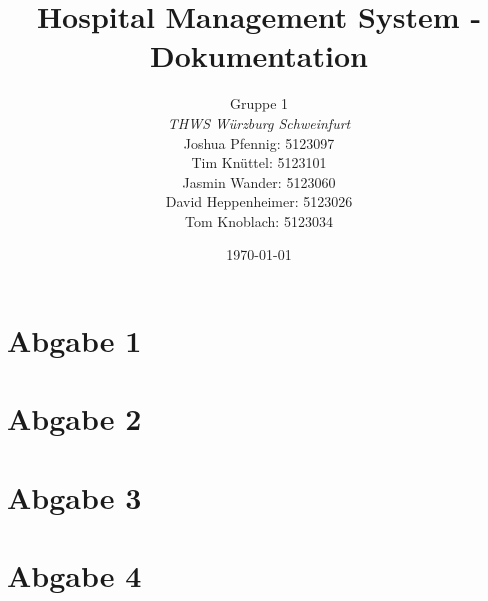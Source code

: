 \documentclass[a4paper,12pt]{report}
\title{Hospital Management System - Dokumentation }
\author{
  {\Large Gruppe 1} \\[0.5em]
  {\large \textit{THWS W\"urzburg Schweinfurt}} \\[1em]
  Joshua Pfennig: 5123097\\
  Tim Kn\"uttel: 5123101\\
  Jasmin Wander: 5123060\\
  David Heppenheimer: 5123026\\
  Tom Knoblach: 5123034
}
\date{\today}
\begin{document}
\maketitle

\clearpage
\tableofcontents
\clearpage

\chapter{Abgabe 1}









\chapter{Abgabe 2}











\chapter{Abgabe 3}








\chapter{Abgabe 4}










\printbibliography
\end{document}
